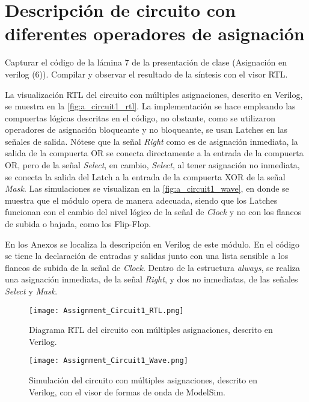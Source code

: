\section{Descripción de circuito con diferentes operadores de asignación \label{sec:s1}}

\begin{center}
	\begin{minipage}{12cm}
		\begin{tcolorbox}[title=Actividad 1]
			Capturar el código de la lámina 7 de la presentación de clase (Asignación en verilog (6)). Compilar y observar el resultado de la síntesis con el visor RTL.
		\end{tcolorbox}	
	\end{minipage}
\end{center}

La visualización RTL del circuito con múltiples asignaciones, descrito en Verilog, se muestra en la \autoref{fig:a_circuit1_rtl}. La implementación se hace empleando las compuertas lógicas descritas en el código, no obstante, como se utilizaron operadores de asignación bloqueante y no bloqueante, se usan Latches en las señales de salida. Nótese que la señal \textit{Right} como es de asignación inmediata, la salida de la compuerta OR se conecta directamente a la entrada de la compuerta OR, pero de la señal \textit{Select}, en cambio, \textit{Select}, al tener asignación no inmediata, se conecta la salida del Latch a la entrada de la compuerta XOR de la señal \textit{Mask}. Las simulaciones se visualizan en la \autoref{fig:a_circuit1_wave}, en donde se muestra que el módulo opera de manera adecuada, siendo que los Latches funcionan con el cambio del nivel lógico de la señal de \textit{Clock} y no con los flancos de subida o bajada, como los Flip-Flop.

En los Anexos se localiza la descripción en Verilog de este módulo. En el código se tiene la declaración de entradas y salidas junto con una lista sensible a los flancos de subida de la señal de \textit{Clock}. Dentro de la estructura \textit{always}, se realiza una asignación inmediata, de la señal \textit{Right}, y dos no inmediatas, de las señales \textit{Select} y \textit{Mask}.

\begin{figure}[ht]
	\centering
{\tiny {\tiny }}	\texttt{[image: Assignment\_Circuit1\_RTL.png]}
	\caption{Diagrama RTL del circuito con múltiples asignaciones, descrito en Verilog. \label{fig:a_circuit1_rtl}}
\end{figure}

\begin{figure}[ht]
	\centering
	\texttt{[image: Assignment\_Circuit1\_Wave.png]}
	\caption{Simulación del circuito con múltiples asignaciones, descrito en Verilog, con el visor de formas de onda de ModelSim. \label{fig:a_circuit1_wave}}
\end{figure}